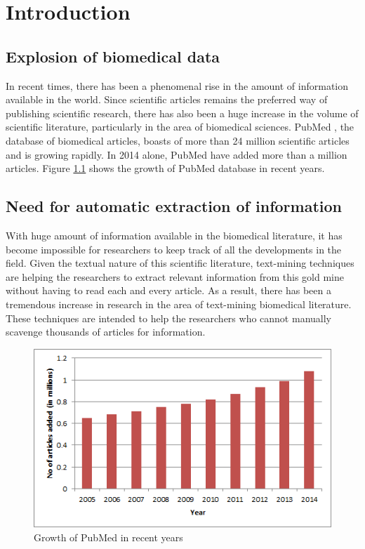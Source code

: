 \chapter{Introduction}\label{chapter:introduction}

\section{Explosion of biomedical data}

In recent times, there has been a phenomenal rise in the amount of information available in the world. Since scientific articles remains the preferred way of publishing scientific research, there has also been a huge increase in the volume of scientific literature, particularly in the area of biomedical sciences. PubMed \cite{pubmed}, the database of biomedical articles, boasts of more than 24 million scientific articles and is growing rapidly. In 2014 alone, PubMed have added more than a million articles. Figure \ref{fig:PubMedTimeLine} shows the growth of PubMed database in recent years.

\section{Need for automatic extraction of information}

With huge amount of information available in the biomedical literature, it has become impossible for researchers to keep track of all the developments in the field. Given the textual nature of this scientific literature, text-mining techniques are helping the researchers to extract relevant information from this gold mine without having to read each and every article. As a result, there has been a tremendous increase in research in the area of text-mining biomedical literature. These techniques are intended to help the researchers who cannot manually scavenge thousands of articles for information.

\begin{figure}
\centering
\includegraphics[scale=1]{figures/PubMedTimeLine.png}
\caption{Growth of PubMed in recent years}\label{fig:PubMedTimeLine}
\end{figure}

